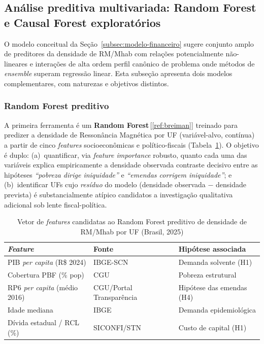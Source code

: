 \documentclass[12pt,a4paper,oneside]{article}
\begin{document}
\subsection{Análise preditiva multivariada: Random Forest e Causal
Forest exploratórios}\label{subsec:ml-models}

O modelo conceitual da Seção~\ref{subsec:modelo-financeiro}
sugere conjunto amplo de preditores da densidade de RM/Mhab com
relações potencialmente não-lineares e interações de alta ordem
\textemdash{} perfil canônico de problema onde métodos de
\textit{ensemble} superam regressão linear. Esta subseção
apresenta dois modelos complementares, com naturezas e objetivos
distintos.

\subsubsection{Random Forest preditivo}

A primeira ferramenta é um \textbf{Random Forest}\,[\ref{ref:breiman}]
treinado para predizer a densidade de Ressonância Magnética por
UF (variável-alvo, contínua) a partir de cinco \textit{features}
socioeconômicas e político-fiscais
(Tabela~\ref{tab:rf-features}). O objetivo é duplo: (a)~quantificar,
via \textit{feature importance} robusto, quanto cada uma das
variáveis explica empiricamente a densidade observada
\textemdash{} contraste decisivo entre as hipóteses
\textit{``pobreza dirige iniquidade''} e \textit{``emendas
corrigem iniquidade''}; e (b)~identificar UFs cujo
\textit{resíduo} do modelo (densidade observada $-$ densidade
prevista) é substancialmente atípico \textemdash{} candidatos a
investigação qualitativa adicional sob lente fiscal-política.

\begin{table}[htbp]
\centering
\caption{Vetor de \textit{features} candidatas ao Random Forest
preditivo de densidade de RM/Mhab por UF (Brasil, 2025)}
\begin{tabular}{lll}
\toprule
\textbf{\textit{Feature}} & \textbf{Fonte} & \textbf{Hipótese associada} \\
\midrule
PIB \textit{per capita} (R\$ 2024) & IBGE-SCN  & Demanda solvente (H1) \\
Cobertura PBF (\% pop)             & CGU       & Pobreza estrutural \\
RP6 \textit{per capita} (médio
2016\textendash 2024)             & CGU/Portal Transparência & Hipótese das emendas (H4) \\
Idade mediana                      & IBGE      & Demanda epidemiológica \\
Dívida estadual / RCL (\%)        & SICONFI/STN & Custo de capital (H1) \\
\bottomrule
\end{tabular}
\par{}
\label{tab:rf-features}
\end{table}
\end{document}
